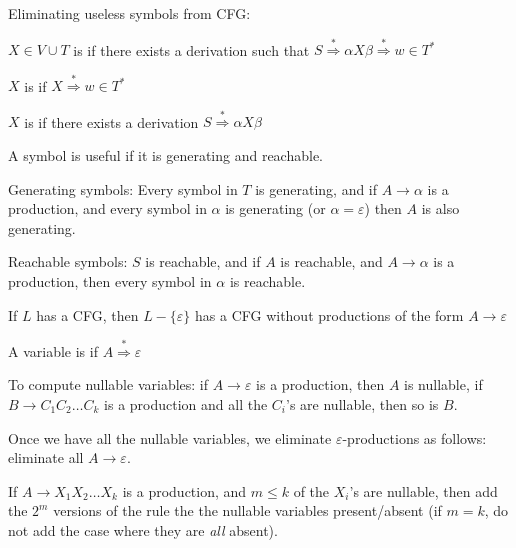\begin{frame}
Eliminating useless symbols from CFG:

$X\in V\cup T$ is  if there exists a derivation such that
$S\stackrel{*}{\Rightarrow}\alpha X\beta\stackrel{*}{\Rightarrow}w\in
T^*$ 

$X$ is  if $X\stackrel{*}{\Rightarrow}w\in T^*$

$X$ is  if there exists a derivation
$S\stackrel{*}{\Rightarrow}\alpha X\beta$

A symbol is useful if it is generating and reachable.

Generating symbols:
Every symbol in $T$ is generating, and if $A\longrightarrow\alpha$ is
a production, and every symbol in $\alpha$ is generating (or
$\alpha=\varepsilon$) then $A$ is also generating.

Reachable symbols:
$S$ is reachable, and if $A$ is reachable, and
$A\longrightarrow\alpha$ is a production, then every symbol in
$\alpha$ is reachable.
\end{frame}

\begin{frame}
If $L$ has a CFG, then $L-\{\varepsilon\}$ has a CFG without
productions of the form $A\longrightarrow\varepsilon$

A variable is  if
$A\stackrel{*}{\Rightarrow}\varepsilon$

To compute nullable variables: if $A\longrightarrow\varepsilon$ is a
production, then $A$ is nullable, if $B\longrightarrow C_1C_2\ldots
C_k$ is a production and all the $C_i$'s are nullable, then so is $B$.

Once we have all the nullable variables, we eliminate
$\varepsilon$-productions as follows: eliminate all
$A\longrightarrow\varepsilon$.

If $A\longrightarrow X_1X_2\ldots X_k$ is a production, and $m\le k$
of the $X_i$'s are nullable, then add the $2^m$ versions of the rule
the the nullable variables present/absent (if $m=k$, do not add the
case where they are {\em all} absent).
\end{frame}

